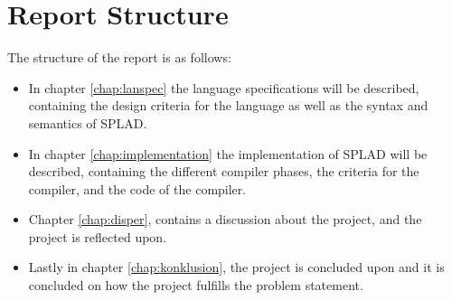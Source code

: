 \section{Report Structure}
The structure of the report is as follows:
\begin{itemize}
	\item In chapter \ref{chap:lanspec} the language specifications will be described, containing the design criteria for the language as well as the syntax and semantics of SPLAD.
	\item In chapter \ref{chap:implementation} the implementation of SPLAD will be described, containing the different compiler phases, the criteria for the compiler, and the code of the compiler.
	\item Chapter \ref{chap:disper}, contains a discussion about the project, and the project is reflected upon. 
	\item Lastly in chapter \ref{chap:konklusion}, the project is concluded upon and it is concluded on how the project fulfills the problem statement.
\end{itemize}